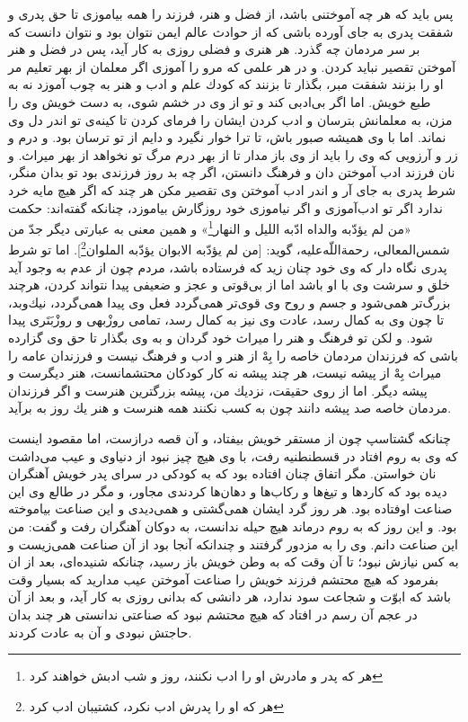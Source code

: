 پس بايد كه هر چه آموختنى باشد، از فضل و هنر، فرزند را همه بياموزى تا حق پدرى و شفقت پدرى به جاى آورده باشى كه از حوادث عالم ايمن نتوان بود و نتوان دانست كه بر سر مردمان چه گذرد. هر هنرى و فضلى روزى به كار آيد، پس در فضل و هنر آموختن تقصير نبايد كردن. و در هر علمى كه مرو را آموزى اگر معلمان از بهر تعليم مر او را بزنند شفقت مبر، بگذار تا بزنند كه كودك علم و ادب و هنر به چوب آموزد نه به طبع خويش. اما اگر بى‌ادبى كند و تو از وى در خشم شوى، به دست خويش وى را مزن، به معلمانش بترسان و ادب كردن ايشان را فرماى كردن تا كينه‌ی تو اندر دل وى نماند. اما با وى هميشه صبور باش، تا ترا خوار نگيرد و دايم از تو ترسان بود. و درم و زر و آرزويى كه وى را بايد از وى باز مدار تا از بهر درم مرگ تو نخواهد از بهر ميراث. و نان فرزند ادب آموختن دان و فرهنگ دانستن، اگر چه بد روز فرزندى بود تو بدان منگر، شرط پدرى به جاى آر و اندر ادب آموختن وى تقصير مكن هر چند كه اگر هيچ مایه خرد ندارد اگر تو ادب‌آموزى و اگر نياموزى خود روزگارش بياموزد، چنانكه گفته‌اند: حكمت «من لم يؤدّبه والداه ادّبه الليل و النهار\footnote{هر که پدر و مادرش او را ادب نکنند، روز و شب ادبش خواهند کرد}» و همين معنى به عبارتى ديگر جدّ من شمس‌المعالى، رحمةاللّه‌عليه، گويد: [من لم يؤدّبه الابوان يؤدّبه الملوان\footnote{هر که او را پدرش ادب نکرد، کشتیبان ادب کرد}]. اما تو شرط پدرى نگاه دار كه وى خود چنان زيد كه فرستاده باشد، مردم چون از عدم به وجود آيد خلق و سرشت وى با او باشد اما از بى‌قوتى و عجز و ضعيفى پيدا نتواند كردن، هرچند بزرگ‌تر همى‌شود و جسم و روح وى قوى‌تر همى‌گردد فعل وى پيدا همى‌گردد، نيك‌و‌بد، تا چون وى به كمال رسد، عادت وى نيز به كمال رسد، تمامى روزْبهى و روز‌ْبَتَرى پيدا شود. و لكن تو فرهنگ و هنر را ميراث خود گردان و به وى بگذار تا حق وى گزارده باشى كه فرزندان مردمان خاصه را بِهْ از هنر و ادب و فرهنگ نيست و فرزندان عامه را ميراث بِهْ از پيشه نيست، هر چند پيشه نه كار كودكان محتشمانست، هنر ديگرست و پيشه ديگر. اما از روى حقيقت، نزديك من، پيشه بزرگترين هنرست و اگر فرزندان مردمان خاصه صد پيشه دانند چون به كسب نكنند همه هنرست و هنر يك روز به برآيد.

چنانكه گشتاسپ چون از مستقر خويش بيفتاد، و آن قصه درازست، اما مقصود اينست كه وى به روم افتاد در قسطنطنيه رفت، با وى هيچ چيز نبود از دنياوى و عيب مى‌داشت نان خواستن. مگر اتفاق چنان افتاده بود كه به كودكى در سراى پدر خويش آهنگران ديده بود كه كاردها و تيغ‌ها و ركاب‌ها و دهان‌ها كردندى مجاور، و مگر در طالع وى اين صناعت اوفتاده بود. هر روز گرد ايشان همى‌گشتى و همى‌ديدى و اين صناعت بياموخته بود. و اين روز كه به روم درماند هيچ حيله ندانست، به دوكان آهنگران رفت و گفت: من اين صناعت دانم. وى را به مزدور گرفتند و چندانكه آنجا بود از آن صناعت همى‌زيست و به كس نيازش نبود؛ تا آن وقت كه به وطن خويش باز رسيد، چنانكه شنيده‌اى، بعد از ان بفرمود كه هيچ محتشم فرزند خويش را صناعت آموختن عيب مداريد كه بسيار وقت باشد كه ابوّت و شجاعت سود ندارد، هر دانشى كه بدانى روزى به كار آيد، و بعد از آن در عجم آن رسم در افتاد كه هيچ محتشم نبود كه صناعتى ندانستى هر چند بدان حاجتش نبودى و آن به عادت كردند.

